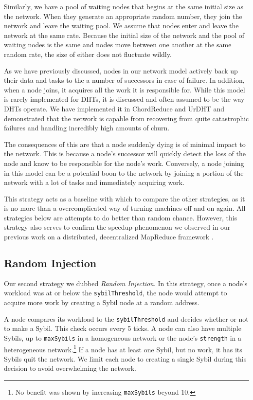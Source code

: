 \documentclass[11pt,conference]{IEEEtran}
\begin{document}
Similarly, we have a pool of waiting nodes that begins at the same initial size as the network.
When they generate an appropriate random number, they join the network and leave the waiting pool.
We assume that nodes enter and leave the network at the same rate.
Because the initial size of the network and the pool of waiting nodes is the same and nodes move between one another at the same random rate, the size of either does not fluctuate wildly.

As we have previously discussed, nodes in our network model actively back up their data and tasks to the a number of successors in case of failure.
In addition, when a node joins, it acquires all the work it is responsible for.
While this model is rarely implemented for DHTs, it is discussed \cite{kademlia} and often assumed to be the way DHTs operate. 
We have implemented it in ChordReduce\cite{chordreduce} and UrDHT\cite{urdht} and demonstrated that the network is capable from recovering from quite catastrophic failures and handling incredibly high amounts of churn.

The consequences of this are that a node suddenly dying is of minimal impact to the network.
This is because a node's successor will quickly detect the loss of the node and know to be responsible for the node's work.
Conversely, a node joining in this model can be a potential boon to the network by joining a portion of the network with a lot of tasks and immediately acquiring work.

This strategy acts as a baseline with which to compare the other strategies, as it is no more than a overcomplicated way of turning machines off and on again. 
All strategies below are attempts to do better than random chance.
However, this strategy also serves to confirm the speedup phenomenon we observed in our previous work on a distributed, decentralized MapReduce framework \cite{chordreduce}.

\subsection{Random Injection}
\label{sec:strat-randomInject}
Our second strategy we dubbed \textit{Random Injection}.
In this strategy, once a node's workload was at or below the \texttt{sybilThreshold}, the node would attempt to acquire more work by creating a Sybil node at a random address.

A node compares its workload to the \texttt{sybilThreshold} and decides whether or not to make a Sybil.
This check occurs every 5 ticks.
A node can also have multiple Sybils, up to \texttt{maxSybils} in a homogeneous network or the node's \texttt{strength} in a heterogeneous network.\footnote{No benefit was shown by increasing \texttt{maxSybils} beyond 10.}
If a node has at least one Sybil, but no work, it has its Sybils quit the network.
We limit each node to creating a single Sybil during this decision to avoid overwhelming the network.
\end{document}
